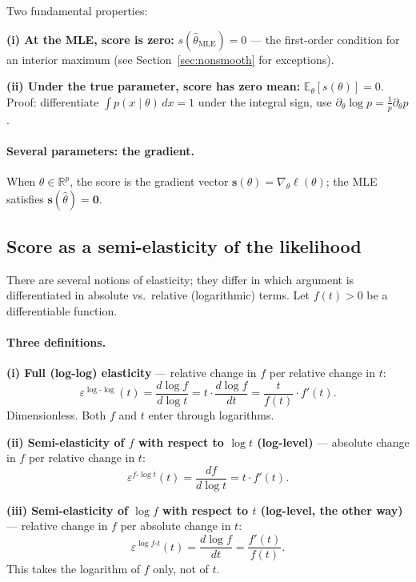 \documentclass[a4paper,oneside,12pt]{extarticle}
\theoremstyle{plain}
\theoremstyle{definition}
\theoremstyle{remark}
\newcommand*{\E}{\mathbb{E}}
\begin{document}
Two fundamental properties:

\textbf{(i) At the MLE, score is zero:}
$s(\hat\theta_\mathrm{MLE}) = 0$ --- the first-order condition for
an interior maximum (see Section~\ref{sec:nonsmooth} for exceptions).

\textbf{(ii) Under the true parameter, score has zero mean:}
$\E_\theta[s(\theta)] = 0$.
Proof: differentiate $\int p(x\mid\theta)\,dx = 1$ under the integral
sign, use $\partial_\theta\log p = \frac{1}{p}\partial_\theta p$.

\paragraph{Several parameters: the gradient.}
When $\theta\in\mathbb{R}^p$, the score is the gradient vector
$\mathbf{s}(\theta)=\nabla_\theta\ell(\theta)$; the MLE satisfies
$\mathbf{s}(\hat\theta)=\mathbf{0}$.

\subsection{Score as a semi-elasticity of the likelihood}
\label{sec:score_elasticity}

There are several notions of elasticity; they differ in which
argument is differentiated in absolute vs.\ relative (logarithmic)
terms.  Let $f(t)>0$ be a differentiable function.

\paragraph{Three definitions.}

\textbf{(i) Full (log-log) elasticity} --- relative change in $f$
per relative change in $t$:
\[
  \varepsilon^{\log\text{-}\log}(t)
  = \frac{d\log f}{d\log t}
  = t\cdot\frac{d\log f}{dt}
  = \frac{t}{f(t)}\cdot f'(t).
\]
Dimensionless.  Both $f$ and $t$ enter through logarithms.

\textbf{(ii) Semi-elasticity of $f$ with respect to $\log t$
(log-level)} --- absolute change in $f$ per relative change in $t$:
\[
  \varepsilon^{f\text{-}\log t}(t)
  = \frac{df}{d\log t}
  = t\cdot f'(t).
\]

\textbf{(iii) Semi-elasticity of $\log f$ with respect to $t$
(log-level, the other way)} --- relative change in $f$ per absolute
change in $t$:
\[
  \varepsilon^{\log f\text{-}t}(t)
  = \frac{d\log f}{dt}
  = \frac{f'(t)}{f(t)}.
\]
This takes the logarithm of $f$ only, not of $t$.
\end{document}
